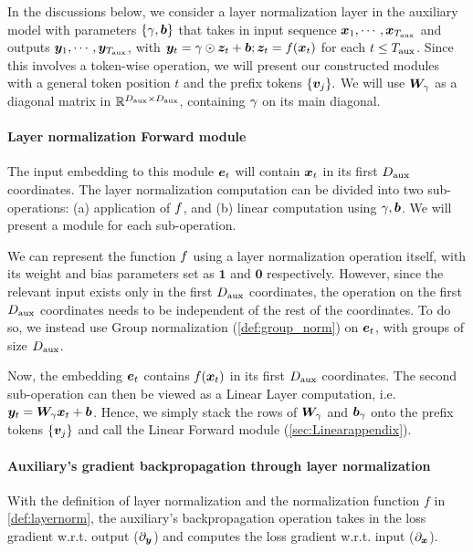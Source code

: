 In the discussions below, we consider a layer normalization layer in the auxiliary model with parameters $\{\mathbf{\gamma}, {\bm{b}}\}$ that takes in input sequence ${\bm{x}}_1, \cdots, {\bm{x}}_{ T_{\text{aux}} }$ and outputs ${\bm{y}}_1, \cdots, {\bm{y}}_{ T_{\text{aux}} }$, with ${\bm{y}}_t = \mathbf{\gamma} \odot {\bm{z}}_t + {\bm{b}}; {\bm{z}}_t = f({\bm{x}}_t)$ for each $t \le T_{\text{aux}}$. Since this involves a token-wise operation, we will present our constructed modules with a general token position $t$ and the prefix tokens $\{{\bm{v}}_j\}.$ We will use ${\bm{W}}_{\mathbf{\gamma}}$ as a diagonal matrix in $\mathbb{R}^{D_{\text{aux}} \times D_{\text{aux}}}$, containing $\mathbf{\gamma}$ on its main diagonal.


\paragraph{\simulator{} Layer normalization Forward module}
The input embedding to this  module $\ve_t$ will contain ${\bm{x}}_t$ in its first $D_{\text{aux}}$ coordinates. 
The layer normalization computation can be divided into two sub-operations: (a) application of $f$, and (b) linear computation using $\mathbf{\gamma}, {\bm{b}}$. We will present a \simulator{} module for each sub-operation.

We can represent the function $f$ using a layer normalization operation itself, with its weight and bias parameters set as $\mathbf{1}$ and $\mathbf{0}$ respectively. However, since the relevant input exists only in the first $D_{\text{aux}}$ coordinates, the operation on the first $D_{\text{aux}}$ coordinates needs to be independent of the rest of the coordinates. To do so, we instead use Group normalization (\cref{def:group_norm}) on $\ve_t$, with groups of size $D_{\text{aux}}$.

Now, the embedding $\ve_t$ contains $f({\bm{x}}_t)$ in its first $D_{\text{aux}}$ coordinates. The second sub-operation can then be viewed as a Linear Layer computation, i.e. ${\bm{y}}_t = {\bm{W}}_{\mathbf{\gamma}} {\bm{x}}_t + {\bm{b}}$. Hence, we simply stack the rows of ${\bm{W}}_{\mathbf{\gamma}}$ and ${\bm{b}}_{\mathbf{\gamma}}$ onto the prefix tokens $\{ {\bm{v}}_j \}$ and call the \simulator{} Linear Forward module (\cref{sec:Linearappendix}).



\paragraph{Auxiliary's gradient backpropagation through layer normalization } With the definition of layer normalization and the normalization function $f$ in \cref{def:layernorm}, the auxiliary's backpropagation operation takes in the loss gradient w.r.t. output ($\partial_{{\bm{y}}}$) and computes the loss gradient  w.r.t. input ($\partial_{{\bm{x}}}$).

